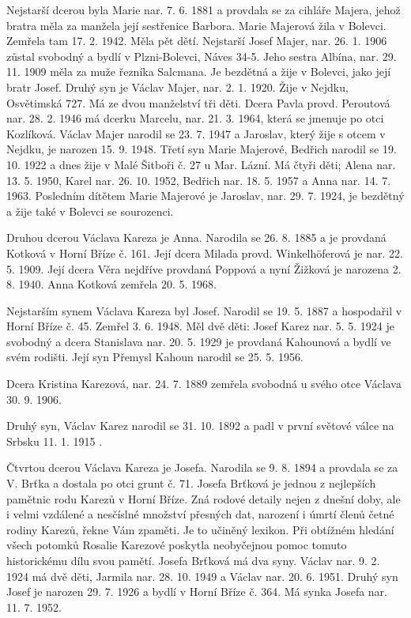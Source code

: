 \documentclass[../dejiny-rodu-prusiku.tex]{subfiles}
\begin{document}
Nejstarší dcerou byla Marie nar. 7. 6. 1881 a provdala se za cihláře Majera, jehož bratra měla za manžela její sestřenice Barbora. Marie Majerová žila v Bolevci. Zemře­la tam 17. 2. 1942. Měla pět dětí. Nejstarší Josef Majer, nar. 26. 1. 1906 zůstal svobodný a bydlí v Plzni-Bolevci, Náves 34-5. Jeho sestra Albína, nar. 29. 11. 1909 měla za muže řezníka Salcmana. Je bezdětná a žije v Bolevci, jako její bratr Josef. Druhý syn je Václav Majer, nar. 2. 1. 1920. Žije v Nejdku, Osvětimská 727. Má ze dvou man­želství tři děti. Dcera Pavla provd. Peroutová nar. 28. 2. 1946 má dcerku Marcelu, nar. 21. 3. 1964, která se jmenuje po otci Kozlíková. Václav Majer narodil se 23. 7. 1947 a Jaroslav, který žije s otcem v Nejdku, je narozen 15. 9. 1948. Třetí syn Marie Majerové, Bedřich narodil se 19. 10. 1922 a dnes žije v Malé Šitboři č. 27 u Mar. Lázní. Má čtyři děti; Alena nar. 13. 5. 1950, Karel nar. 26. 10. 1952, Bedřich nar. 18. 5. 1957 a Anna nar. 14. 7. 1963. Posledním dítětem Marie Majerové je Jaroslav, nar. 29. 7. 1924, je bezdětný a žije také v Bolevci se sourozenci.

Druhou dcerou Václava Kareza je Anna. Narodila se 26. 8. 1885 a je provdaná Kotková v Horní Bříze č. 161. Její dcera Milada provd. Winkelhöferová je nar. 22. 5. 1909. Její dcera Věra nejdříve provdaná Poppová a nyní Žižková je narozena 2. 8. 1940. Anna Kotková zemřela 20. 5. 1968.

Nejstarším synem Václava Kareza byl Josef. Narodil se 19. 5. 1887 a hospodařil v Horní Bříze č. 45. Zemřel 3. 6. 1948. Měl dvě děti: Josef Karez nar. 5. 5. 1924 je svobodný a dcera Stanislava nar. 20. 5. 1929 je provdaná Kahounová a bydlí ve svém rodišti. Její syn Přemysl Kahoun narodil se 25. 5. 1956.

Dcera Kristina Karezová, nar. 24. 7. 1889 zemřela svo­bodná u svého otce Václava 30. 9. 1906.

Druhý syn, Václav Karez narodil se 31. 10. 1892 a padl v první světové válce na Srbsku 11. 1. 1915 .

Čtvrtou dcerou Václava Kareza je Josefa. Narodila se 9. 8. 1894 a provdala se za V. Brťka a dostala po otci grunt č. 71. Josefa Brťková je jednou z nejlepších pamětnic rodu Karezů v Horní Bříze. Zná rodové detaily nejen z dnešní doby, ale i velmi vzdálené a nesčíslné množství přesných dat, narození i úmrtí členů četné rodiny Karezů, řekne Vám zpaměti. Je to učiněný lexikon. Při obtížném hledání všech potomků Rosalie Karezové poskytla neobyčejnou pomoc tomuto historickému dílu svou pamětí. Josefa Brťková má dva syny. Václav nar. 9. 2. 1924 má dvě děti, Jarmila nar. 28. 10. 1949 a Václav nar. 20. 6. 1951. Druhý syn Josef je narozen 29. 7. 1926 a bydlí v Horní Bříze č. 364. Má synka Josefa nar. 11. 7. 1952.
\end{document}
